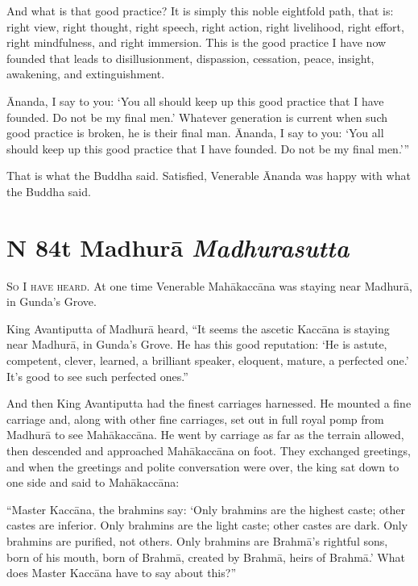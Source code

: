 \documentclass[12pt,openany]{book}%
\newcommand*{\suttatitleacronym}[1]{\smaller[2]{#1}\vspace*{.3em}}
\newcommand*{\suttatitletranslation}[1]{\linebreak{#1}}
\newcommand*{\suttatitleroot}[1]{\linebreak\smaller[2]\itshape{#1}}
\newcommand*{\tocacronym}[1]{\hspace*{-3.3em}{#1}\quad}
\newcommand*{\toctranslation}[1]{#1}
\newcommand*{\tocroot}[1]{(\textit{#1})}
\newcommand*{\scevam}[1]{\textsc{#1}}
\begin{document}
And what is that good practice? It is simply this noble eightfold path, that is: right view, right thought, right speech, right action, right livelihood, right effort, right mindfulness, and right immersion. This is the good practice I have now founded that leads to disillusionment, dispassion, cessation, peace, insight, awakening, and extinguishment. 

Ānanda, I say to you: ‘You all should keep up this good practice that I have founded. Do not be my final men.’ Whatever generation is current when such good practice is broken, he is their final man. Ānanda, I say to you: ‘You all should keep up this good practice that I have founded. Do not be my final men.’” 

That is what the Buddha said. Satisfied, Venerable Ānanda was happy with what the Buddha said. 

%
\section*{{\suttatitleacronym MN 84}{\suttatitletranslation At Madhurā }{\suttatitleroot Madhurasutta}}
\addcontentsline{toc}{section}{\tocacronym{MN 84} \toctranslation{At Madhurā } \tocroot{Madhurasutta}}

\scevam{So I have heard. }At one time Venerable \textsanskrit{Mahākaccāna} was staying near \textsanskrit{Madhurā}, in Gunda’s Grove. 

King Avantiputta of \textsanskrit{Madhurā} heard, “It seems the ascetic \textsanskrit{Kaccāna} is staying near \textsanskrit{Madhurā}, in Gunda’s Grove. He has this good reputation: ‘He is astute, competent, clever, learned, a brilliant speaker, eloquent, mature, a perfected one.’ It’s good to see such perfected ones.” 

And then King Avantiputta had the finest carriages harnessed. He mounted a fine carriage and, along with other fine carriages, set out in full royal pomp from \textsanskrit{Madhurā} to see \textsanskrit{Mahākaccāna}. He went by carriage as far as the terrain allowed, then descended and approached \textsanskrit{Mahākaccāna} on foot. They exchanged greetings, and when the greetings and polite conversation were over, the king sat down to one side and said to \textsanskrit{Mahākaccāna}: 

“Master \textsanskrit{Kaccāna}, the brahmins say: ‘Only brahmins are the highest caste; other castes are inferior. Only brahmins are the light caste; other castes are dark. Only brahmins are purified, not others. Only brahmins are \textsanskrit{Brahmā}’s rightful sons, born of his mouth, born of \textsanskrit{Brahmā}, created by \textsanskrit{Brahmā}, heirs of \textsanskrit{Brahmā}.’ What does Master \textsanskrit{Kaccāna} have to say about this?” 
\end{document}
